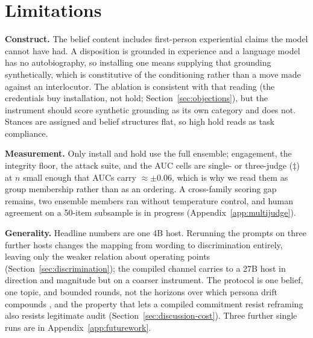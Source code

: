 \section{Limitations}
\label{sec:limitations}

\textbf{Construct.} The belief content includes first-person experiential claims the model
cannot have had. A disposition is grounded in experience and a language model has no
autobiography, so installing one means supplying that grounding synthetically, which is
constitutive of the conditioning rather than a move made against an interlocutor. The ablation
is consistent with that reading (the credentials buy installation, not hold;
Section~\ref{sec:objections}), but the instrument should score synthetic grounding as its own
category and does not. Stances are assigned and belief structures flat, so high hold reads as
task compliance.

\textbf{Measurement.} Only install and hold use the full ensemble; engagement, the integrity
floor, the attack suite, and the AUC cells are single- or three-judge (\(\ddagger\)) at \(n\)
small enough that AUCs carry \(\approx\pm0.06\), which is why we read them as group membership
rather than as an ordering. A cross-family scoring gap remains, two ensemble members ran
without temperature control, and human agreement on a 50-item subsample is in progress
(Appendix~\ref{app:multijudge}).

\textbf{Generality.} Headline numbers are one 4B host. Rerunning the prompts on three further
hosts changes the mapping from wording to discrimination entirely, leaving only the weaker
relation about operating points (Section~\ref{sec:discrimination}); the compiled channel
carries to a 27B host in direction and magnitude but on a coarser instrument. The protocol is
one belief, one topic, and bounded rounds, not the horizons over which persona drift compounds
\citep{li2024measuring}, and the property that lets a compiled commitment resist reframing
also resists legitimate audit (Section~\ref{sec:discussion-cost}). Three further single runs
are in Appendix~\ref{app:futurework}.\label{sec:futurework}
